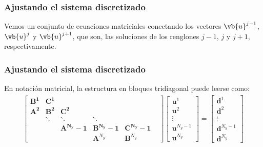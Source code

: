 \begin{frame}
\frametitle{Ajustando el sistema discretizado}
Vemos un conjunto de ecuaciones matriciales conectando los vectores $\vb{u}^{j-1}$, $\vb{u}^{j}$ y $\vb{u}^{j+1}$, que son, las soluciones de los renglones $j-1$, $j$ y $j+1$, respectivamente.
\end{frame}
\begin{frame}
\frametitle{Ajustando el sistema discretizado}
En notación matricial, la estructura en bloques tridiagonal puede leerse como:
\pause
\fontsize{10}{10}\selectfont
\begin{align}
\begin{bmatrix}
\mathbf{B^{1}} & \mathbf{C^{1}} & & & \\
\mathbf{A^{2}} & \mathbf{B^{2}} & \mathbf{C^{2}} & & \\
 & \ddots & \ddots & \ddots & \\
 & & \mathbf{A^{N_{y}}-1} & \mathbf{B^{N_{y}}-1} & \mathbf{C^{N_{y}}-1}& \\
 & & & \mathbf{A}^{N_{y}} & \mathbf{B}^{N_{y}} 
\end{bmatrix}
\begin{bmatrix}
\mathbf{u}^{1} \\
\mathbf{u}^{2} \\
\vdots \\
\mathbf{u}^{N_{y} - 1} \\
\mathbf{u}^{N_{y}}
\end{bmatrix} = 
\begin{bmatrix}
\mathbf{d}^{1} \\
\mathbf{d}^{2} \\
\vdots \\
\mathbf{d}^{N_{y} - 1} \\
\mathbf{d}^{N_{y}}
\end{bmatrix}
\label{eq:ecuacion_13_18}
\end{align}
\end{frame}
